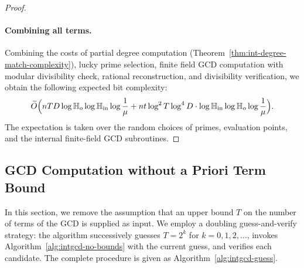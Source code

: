 \documentclass{article}
\numberwithin{equation}{section}
\begin{document}
\begin{proof}
\paragraph{Combining all terms.}
Combining the costs of partial degree computation (Theorem~\ref{thm:int-degree-match-complexity}), lucky prime selection, finite field GCD computation with modular divisibility check, rational reconstruction, and divisibility verification, we obtain the following expected bit complexity:
\[
\widetilde{O}\Bigl(
nTD\log\mathbb{H}_{o}\log\mathbb{H}_{\rm in}\log\frac{1}{\mu}
+ n t \log^2 T\log^4 D \cdot \log \mathbb{H}_{\rm in} \log\mathbb{H}_{o}\log\frac{1}{\mu}
\Bigr).
\]
The expectation is taken over the random choices of primes, evaluation points, and the internal finite-field GCD subroutines.
\end{proof}











\subsection*{GCD Computation without a Priori Term Bound}

In this section, we remove the assumption that an upper bound $T$ on the number of terms of the GCD is supplied as input. 
We employ a doubling guess-and-verify strategy: the algorithm successively guesses $T = 2^k$ for $k = 0,1,2,\dots$, 
invokes Algorithm~\ref{alg:intgcd-no-bounds} with the current guess, and verifies each candidate. 
The complete procedure is given as Algorithm~\ref{alg:intgcd-guess}.
\end{document}
